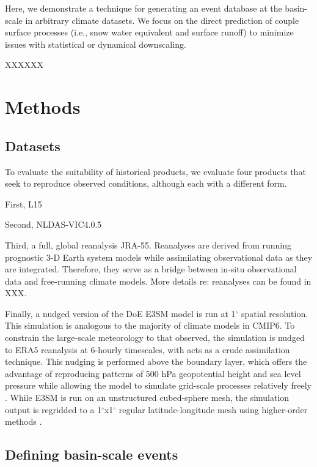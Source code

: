 \documentclass[draft]{agujournal2019}
\newcommand{\degree}{$^{\circ}$}
\begin{document}
Here, we demonstrate a technique for generating an event database at the basin-scale in arbitrary climate datasets. We focus on the direct prediction of couple surface processes (i.e., snow water equivalent and surface runoff) to minimize issues with statistical or dynamical downscaling. 


XXXXXX

\section{Methods}

\subsection{Datasets}


To evaluate the suitability of historical products, we evaluate four products that seek to reproduce observed conditions, although each with a different form.

First, L15

Second, NLDAS-VIC4.0.5

Third, a full, global reanalysis JRA-55. Reanalyses are derived from running prognostic 3-D Earth system models while assimilating observational data as they are integrated. Therefore, they serve as a bridge between in-situ observational data and free-running climate models. More details re: reanalyses can be found in XXX.

Finally, a nudged version of the DoE E3SM model is run at 1\degree{} spatial resolution. This simulation is analogous to the majority of climate models in CMIP6. To constrain the large-scale meteorology to that observed, the simulation is nudged to ERA5 reanalysis at 6-hourly timescales, with acts as a crude assimilation technique. This nudging is performed above the boundary layer, which offers the advantage of reproducing patterns of 500 hPa geopotential height and sea level pressure while allowing the model to simulate grid-scale processes relatively freely \citep{sun2019impact}. While E3SM is run on an unstructured cubed-sphere mesh, the simulation output is regridded to a 1\degree{}x1\degree{} regular latitude-longitude mesh using higher-order methods \citep{hill2004architecture}. 

\subsection{Defining basin-scale events}
\end{document}
